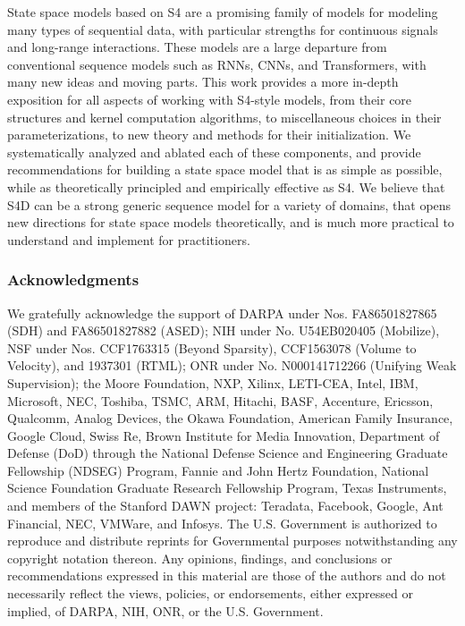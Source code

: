 \documentclass{article}
\begin{document}
State space models based on S4 are a promising family of models for modeling many types of sequential data, with particular strengths for continuous signals and long-range interactions.
These models are a large departure from conventional sequence models such as RNNs, CNNs, and Transformers, with many new ideas and moving parts.
This work provides a more in-depth exposition for all aspects of working with S4-style models, from their core structures and kernel computation algorithms,
to miscellaneous choices in their parameterizations, to new theory and methods for their initialization.
We systematically analyzed and ablated each of these components, and provide recommendations for building a state space model that is as simple as possible, while as theoretically principled and empirically effective as S4.
We believe that S4D can be a strong generic sequence model for a variety of domains, that opens new directions for state space models theoretically, and is much more practical to understand and implement for practitioners.
 

\subsubsection*{Acknowledgments}
We gratefully acknowledge the support of DARPA under Nos. FA86501827865 (SDH) and FA86501827882 (ASED); NIH under No. U54EB020405 (Mobilize), NSF under Nos. CCF1763315 (Beyond Sparsity), CCF1563078 (Volume to Velocity), and 1937301 (RTML); ONR under No. N000141712266 (Unifying Weak Supervision); the Moore Foundation, NXP, Xilinx, LETI-CEA, Intel, IBM, Microsoft, NEC, Toshiba, TSMC, ARM, Hitachi, BASF, Accenture, Ericsson, Qualcomm, Analog Devices, the Okawa Foundation, American Family Insurance, Google Cloud, Swiss Re, Brown Institute for Media Innovation, Department of Defense (DoD) through the National Defense Science and Engineering Graduate Fellowship (NDSEG) Program,  Fannie and John Hertz Foundation, National Science Foundation Graduate Research Fellowship Program, Texas Instruments, and members of the Stanford DAWN project: Teradata, Facebook, Google, Ant Financial, NEC, VMWare, and Infosys. The U.S. Government is authorized to reproduce and distribute reprints for Governmental purposes notwithstanding any copyright notation thereon. Any opinions, findings, and conclusions or recommendations expressed in this material are those of the authors and do not necessarily reflect the views, policies, or endorsements, either expressed or implied, of DARPA, NIH, ONR, or the U.S. Government.
\end{document}

